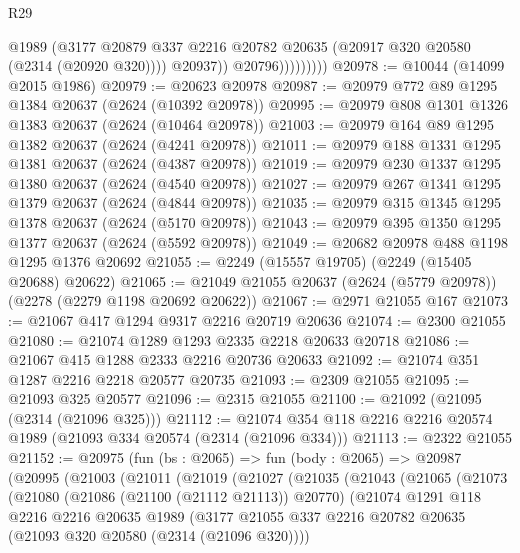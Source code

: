 \begin{lexlean}{R29}
\begin{coremodule}
                          @1989
                          (@3177
                            @20879
                            @337
                            @2216
                            @20782
                            @20635
                            (@20917 @320 @20580 (@2314 (@20920 @320))))
                          @20937))
                      @20796)))))))))
@20978 := @10044 (@14099 @2015 @1986)
@20979 := @20623 @20978
@20987 := @20979 @772 @89 @1295 @1384 @20637 (@2624 (@10392 @20978))
@20995 := @20979 @808 @1301 @1326 @1383 @20637 (@2624 (@10464 @20978))
@21003 := @20979 @164 @89 @1295 @1382 @20637 (@2624 (@4241 @20978))
@21011 := @20979 @188 @1331 @1295 @1381 @20637 (@2624 (@4387 @20978))
@21019 := @20979 @230 @1337 @1295 @1380 @20637 (@2624 (@4540 @20978))
@21027 := @20979 @267 @1341 @1295 @1379 @20637 (@2624 (@4844 @20978))
@21035 := @20979 @315 @1345 @1295 @1378 @20637 (@2624 (@5170 @20978))
@21043 := @20979 @395 @1350 @1295 @1377 @20637 (@2624 (@5592 @20978))
@21049 := @20682 @20978 @488 @1198 @1295 @1376 @20692
@21055 := @2249 (@15557 @19705) (@2249 (@15405 @20688) @20622)
@21065 := @21049 @21055 @20637 (@2624 (@5779 @20978)) (@2278 (@2279 @1198 @20692 @20622))
@21067 := @2971 @21055 @167
@21073 := @21067 @417 @1294 @9317 @2216 @20719 @20636
@21074 := @2300 @21055
@21080 := @21074 @1289 @1293 @2335 @2218 @20633 @20718
@21086 := @21067 @415 @1288 @2333 @2216 @20736 @20633
@21092 := @21074 @351 @1287 @2216 @2218 @20577 @20735
@21093 := @2309 @21055
@21095 := @21093 @325 @20577
@21096 := @2315 @21055
@21100 := @21092 (@21095 (@2314 (@21096 @325)))
@21112 := @21074 @354 @118 @2216 @2216 @20574 @1989 (@21093 @334 @20574 (@2314 (@21096 @334)))
@21113 := @2322 @21055
@21152 := @20975
    (fun (bs : @2065) =>
    fun (body : @2065) =>
    @20987
      (@20995
        (@21003
          (@21011
            (@21019
              (@21027
                (@21035
                  (@21043
                    (@21065
                      (@21073
                        (@21080
                          (@21086 (@21100 (@21112 @21113)) @20770)
                          (@21074
                            @1291
                            @118
                            @2216
                            @2216
                            @20635
                            @1989
                            (@3177
                              @21055
                              @337
                              @2216
                              @20782
                              @20635
                              (@21093 @320 @20580 (@2314 (@21096 @320))))

\end{coremodule}
\end{lexlean}
